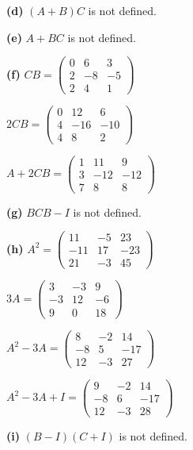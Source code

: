 \documentclass[oneside,12pt]{amsart}
\begin{document}
\smallskip

\textbf{(d)} $(A + B) C$ is not defined.

\smallskip

\textbf{(e)} $A+BC$ is not defined.

\smallskip

\textbf{(f)}
$
CB =
\begin{pmatrix}
0 & 6 & 3 \\
2 & -8 & -5 \\
2 & 4 & 1
\end{pmatrix}
$

$
2CB =
\begin{pmatrix}
0 & 12 & 6 \\
4 & -16 & -10 \\
4 & 8 & 2
\end{pmatrix}
$

$
A + 2CB =
\begin{pmatrix}
1 & 11 & 9\\
3 & -12 & -12\\
7 & 8 & 8
\end{pmatrix}
$

\smallskip

\textbf{(g)} $BCB - I$ is not defined.

\smallskip

\textbf{(h)}
$A^2 =
\begin{pmatrix}
11 & -5 & 23 \\
-11 & 17 & -23 \\
21 & -3 & 45
\end{pmatrix}
$

$3A=
\begin{pmatrix}
3 & -3 & 9 \\
-3 & 12 & -6 \\
9 & 0 & 18
\end{pmatrix}
$

$
A^2 - 3A =
\begin{pmatrix}
8 & -2 & 14 \\
-8 & 5 & -17 \\
12 & -3 & 27
\end{pmatrix}
$

$
A^2 - 3A + I=
\begin{pmatrix}
9 & -2 & 14 \\
-8 & 6 & -17 \\
12 & -3 & 28
\end{pmatrix}
$

\smallskip

\textbf{(i)} $(B-I)(C+I)$ is not defined.
\end{document}
